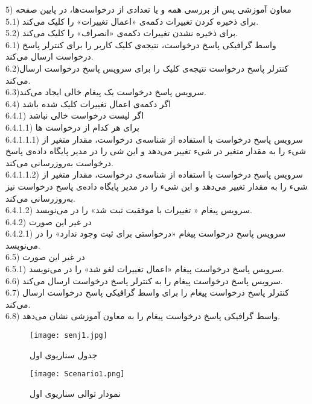 \documentclass{report}
\begin{document}
5) معاون آموزشی پس از بررسی همه و یا تعدادی از درخواست‌ها، در پایین صفحه \\
5.1) برای ذخیره‌ کردن تغییرات دکمه‌ی «اعمال تغییرات» را کلیک می‌کند.\\
5.2) برای ذخیره‌ نشدن تغییرات دکمه‌ی «انصراف» را کلیک می‌کند.\\
6.1) واسط گرافیکی پاسخ درخواست، نتیجه‌ی کلیک کاربر را برای کنترلر پاسخ درخواست ارسال می‌کند.\\
6.2)کنترلر پاسخ درخواست نتیجه‌ی کلیک را برای سرویس پاسخ درخواست ارسال می‌کند.\\
6.3)سرویس پاسخ درخواست یک پیغام خالی 
 ایجاد می‌کند.\\
6.4) اگر دکمه‌ی اعمال تغییرات کلیک شده باشد\\
6.4.1) اگر لیست درخواست خالی نباشد\\
6.4.1.1) برای هر کدام از درخواست ها\\
6.4.1.1.1) سرویس پاسخ درخواست با استفاده از شناسه‌ی درخواست، مقدار متغیر 
 از شیء
   را به مقدار متغیر
     در شیء
       تغییر می‌دهد و این شی را در مدیر پایگاه داده‌ی پاسخ درخواست به‌روزرسانی می‌کند.\\
6.4.1.1.2) سرویس‌ پاسخ درخواست با استفاده از شناسه‌ی درخواست، مقدار متغیر
 از شیء
  را به مقدار
   تغییر می‌دهد و این شیء را در مدیر پایگاه داده‌ی پاسخ درخواست نیز به‌روزرسانی می‌کند.\\
6.4.1.2) سرویس پیغام « تغییرات با موفقیت ثبت شد» را در 
 می‌نویسد.\\
6.4.2) در غیر این صورت\\
6.4.2.1) سرویس پاسخ‌ درخواست پیغام «درخواستی برای ثبت وجود ندارد» را در 
 می‌نویسد.\\
6.5) در غیر این صورت\\
6.5.1) سرویس پاسخ درخواست پیغام «اعمال تغییرات لغو شد» را در 
 می‌نویسد.\\
6.6) سرویس پاسخ درخواست پیغام 
 را به کنترلر پاسخ درخواست ارسال می‌کند.\\
6.7) کنترلر پاسخ درخواست پیغام 
را برای واسط گرافیکی پاسخ درخواست ارسال می‌کند.\\
6.8) واسط گرافیکی پاسخ درخواست پیغام 
را به معاون آموزشی نشان می‌دهد.\\
\clearpage
\begin{figure}[!htb]
\texttt{[image: senj1.jpg]}
\caption{جدول سناریوی اول} 
\end{figure} 
\clearpage
{}
\begin{figure}[!h]
\centering
\texttt{[image: Scenario1.png]}
\caption{نمودار توالی سناریوی اول}
\end{figure}
\clearpage
\restoregeometry
\end{document}
